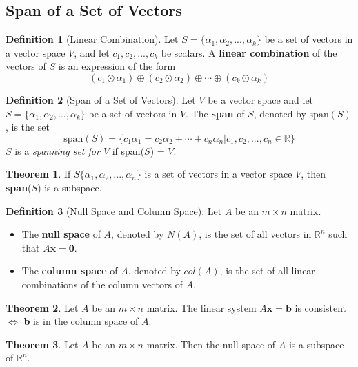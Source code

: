 \documentclass{article}
\renewcommand{\bf}[1]{\textbf{#1}}
\theoremstyle{definition}
\newtheorem{theorem}{Theorem}
\newtheorem{definition}{Definition}
\newcommand{\reals}{\mathbb{R}}
\begin{document}
	\subsection{Span of a Set of Vectors}
	\begin{definition}[Linear Combination]
		Let $S = \{\alpha_1, \alpha_2, ..., \alpha_k\}$ be a set of vectors in a vector space $V$, and let $c_1, c_2, ..., c_k$ be scalars. A \textbf{linear combination} of the vectors of $S$ is an expression of the form
		\[ (c_1 \odot \alpha_1) \oplus (c_2 \odot \alpha_2) \oplus \cdots \oplus (c_k \odot \alpha_k) \]
	\end{definition}
	\begin{definition}[Span of a Set of Vectors]
		Let $V$ be a vector space and let $S = \{\alpha_1, \alpha_2, ..., \alpha_k\}$
		be a set of vectors in $V$. The \textbf{span} of $S$, denoted by $\text{span}(S)$, is the set
		\[ \text{span}(S)= \{ c_1\alpha_1 = c_2\alpha_2 + \cdots + c_n\alpha_n | c_1, c_2, ..., c_n \in \reals \} \]
		$S$ is a \emph{spanning set for $V$} if span($S$) = $V$.
	\end{definition}
	\begin{theorem}
		If $S \{\alpha_1, \alpha_2, ..., \alpha_n\}$ is a set of vectors in a vector space $V$, then \bf{span}($S$) is a subspace.
	\end{theorem}
	\begin{definition}[Null Space and Column Space]
		Let $A$ be an $m \times n$ matrix.
		\begin{itemize}[font=\bfseries,itemsep=0pt]
			\item The \bf{null space} of $A$, denoted by $N(A)$, is the set of all vectors in $\reals^n$ such that $A\bf{x} = \bf{0}$.
			\item The \bf{column space} of $A$, denoted by $col(A)$, is the set of all linear combinations of the column vectors of $A$.
		\end{itemize}
	\end{definition}
	\begin{theorem}
		Let $A$ be an $m \times n$ matrix. The linear system $A\bf{x} = \bf{b}$ is consistent $\iff$ \bf{b} is in the column space of $A$.
	\end{theorem}
	\begin{theorem}
		Let $A$ be an $m \times n$ matrix. Then the null space of $A$ is a subspace of $\reals^n$.
	\end{theorem}
\end{document}
